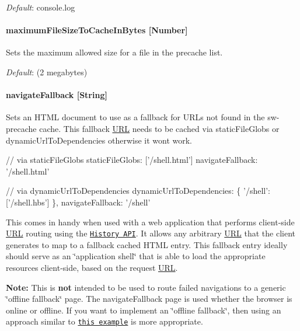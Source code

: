 {\itshape Default}\+: {\ttfamily console.\+log}

\paragraph*{maximum\+File\+Size\+To\+Cache\+In\+Bytes \mbox{[}Number\mbox{]}}

Sets the maximum allowed size for a file in the precache list.

{\itshape Default}\+: {} (2 megabytes)

\paragraph*{navigate\+Fallback \mbox{[}String\mbox{]}}

Sets an H\+T\+ML document to use as a fallback for U\+R\+Ls not found in the {\ttfamily sw-\/precache} cache. This fallback \mbox{\hyperlink{namespace_u_r_l}{U\+RL}} needs to be cached via {\ttfamily static\+File\+Globs} or {\ttfamily dynamic\+Url\+To\+Dependencies} otherwise it won\textquotesingle{}t work.


\begin{DoxyCode}
// via staticFileGlobs
staticFileGlobs: ['/shell.html']
navigateFallback: '/shell.html'

// via dynamicUrlToDependencies
dynamicUrlToDependencies: \{
  '/shell': ['/shell.hbs']
\},
navigateFallback: '/shell'
\end{DoxyCode}


This comes in handy when used with a web application that performs client-\/side \mbox{\hyperlink{namespace_u_r_l}{U\+RL}} routing using the \href{https://developer.mozilla.org/en-US/docs/Web/API/History}{\tt History A\+PI}. It allows any arbitrary \mbox{\hyperlink{namespace_u_r_l}{U\+RL}} that the client generates to map to a fallback cached H\+T\+ML entry. This fallback entry ideally should serve as an \char`\"{}application shell\char`\"{} that is able to load the appropriate resources client-\/side, based on the request \mbox{\hyperlink{namespace_u_r_l}{U\+RL}}.

{\bfseries Note\+:} This is {\bfseries not} intended to be used to route failed navigations to a generic \char`\"{}offline fallback\char`\"{} page. The {\ttfamily navigate\+Fallback} page is used whether the browser is online or offline. If you want to implement an \char`\"{}offline fallback\char`\"{}, then using an approach similar to \href{https://googlechrome.github.io/samples/service-worker/custom-offline-page/}{\tt this example} is more appropriate.

